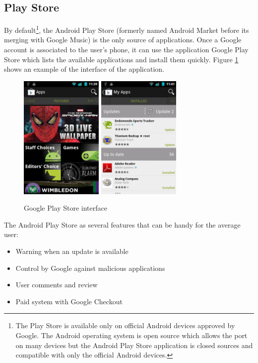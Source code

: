 \subsection{Play Store}
By default\footnote{The Play Store is available only on official Android devices approved by Google. The Android operating system is open source which allows the port on many devices but the Android Play Store application is closed sources and compatible with only the official Android devices.}, the Android Play Store (formerly named Android Market before its merging with Google Music) is the only source of applications.
Once a Google account is associated to the user's phone, it can use the application Google Play Store which lists the available applications and install them quickly.
Figure \ref{fig:market} shows an example of the interface of the application.\\

\begin{figure}[h]
  \centering
  \includegraphics[width=4cm]{images/market1.png}
  \includegraphics[width=4cm]{images/market2.png}
  \caption{Google Play Store interface}
  \label{fig:market}
\end{figure}

The Android Play Store as several features that can be handy for the average user:
\begin{itemize}
\item Warning when an update is available
\item Control by Google against malicious applications
\item User comments and review
\item Paid system with Google Checkout
\end{itemize}

